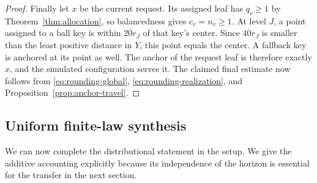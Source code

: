 \begin{proof}
Finally let $x$ be the current request.  Its assigned leaf has $q_v\ge1$
by Theorem~\ref{thm:allocation}, so balancedness gives $c_v=n_v\ge1$.
At level $J$, a point assigned to a ball key is within $20r_J$ of that
key's center.  Since $40r_J$ is smaller than the least positive distance
in $Y$, this point equals the center.  A fallback key is anchored at its
point as well.  The anchor of the request leaf is therefore exactly $x$,
and the simulated configuration serves it.  The claimed final estimate now
follows from \eqref{eq:rounding-global}, \eqref{eq:rounding-realization},
and Proposition~\ref{prop:anchor-travel}.
\end{proof}

\subsection{Uniform finite-law synthesis}

We can now complete the distributional statement in the setup.  We give the
additive accounting explicitly because its independence of the horizon is
essential for the transfer in the next section.

